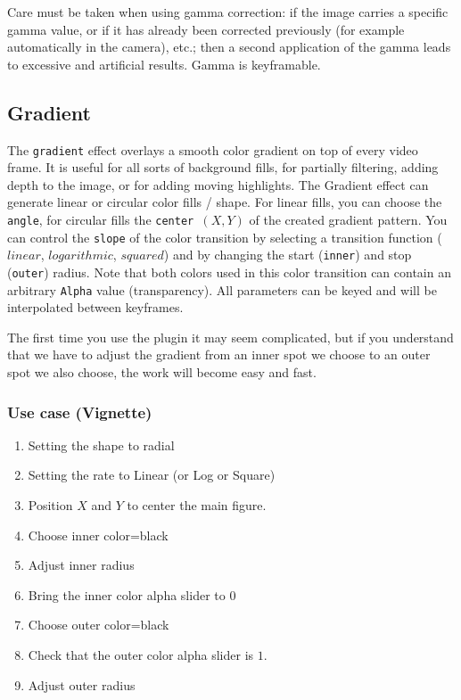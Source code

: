 Care must be taken when using gamma correction: if the image carries a specific gamma value, or if it has already been corrected previously (for example automatically in the camera), etc.; then a second application of the gamma leads to excessive and artificial results. Gamma is keyframable.

\subsection{Gradient}%
\label{sub:gradient}

The \texttt{gradient} effect overlays a smooth color gradient on top of every video frame. It is useful for all sorts of background fills, for partially filtering, adding depth to the image, or for adding moving highlights. The Gradient effect can generate linear or circular color fills / shape. For linear fills, you can choose the \texttt{angle}, for circular fills the \texttt{center $(X,Y)$} of the created gradient pattern. You can control the \texttt{slope} of the color transition by selecting a transition function ($linear$, $logarithmic$, $squared$) and by changing the start (\texttt{inner}) and stop (\texttt{outer}) radius. Note that both colors used in this color transition can contain an arbitrary \texttt{Alpha} value (transparency). All parameters can be keyed and will be interpolated between keyframes.

The first time you use the plugin it may seem complicated, but if you understand that we have to adjust the gradient from an inner spot we choose to an outer spot we also choose, the work will become easy and fast.

\subsubsection*{Use case (Vignette)}
\label{ssub:use_case_vignette}

\begin{enumerate}
    \item Setting the shape to radial
    \item Setting the rate to Linear (or Log or Square)
    \item Position $X$ and $Y$ to center the main figure.
    \item Choose inner color=black
    \item Adjust inner radius
    \item Bring the inner color alpha slider to $0$
    \item Choose outer color=black
    \item Check that the outer color alpha slider is $1$.
    \item Adjust outer radius
\end{enumerate}


